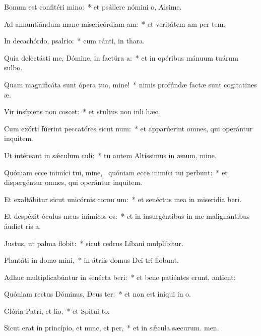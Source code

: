 \item Bonum est confitéri mino:~* et psállere nómini o, Alsime.
\item Ad annuntiándum mane misericórdiam am:~* et veritátem am per tem.
\item In decachórdo, psalrio:~* cum cánti, in thara.
\item Quia delectásti me, Dómine, in factúra a:~* et in opéribus mánuum tuárum sulbo.
\item Quam magnificáta sunt ópera tua, mine!~* nimis profúndæ factæ sunt cogitatines æ.
\item Vir insípiens non coscet:~* et stultus non inli hæc.
\item Cum exórti fúerint peccatóres sicut num:~* et apparúerint omnes, qui operántur inquitem.
\item Ut intéreant in sǽculum culi:~* tu autem Altíssimus in ænum, mine.
\item Quóniam ecce inimíci tui, mine,~\pscross{} quóniam ecce inimíci tui perbunt:~* et dispergéntur omnes, qui operántur inquitem.
\item Et exaltábitur sicut unicórnis cornu um:~* et senéctus mea in miseridia beri.
\item Et despéxit óculus meus inimícos os:~* et in insurgéntibus in me malignántibus áudiet ris a.
\item Justus, ut palma flobit:~* sicut cedrus Líbani mulplibitur.
\item Plantáti in domo mini,~* in átriis domus Dei tri flobunt.
\item Adhuc multiplicabúntur in senécta beri:~* et bene patiéntes erunt,  antient:
\item Quóniam rectus Dóminus, Deus ter:~* et non est iníqui in o.
\item Glória Patri, et lio,~* et Spitui to.
\item Sicut erat in princípio, et nunc, et per,~* et in sǽcula sæcurum. men.
